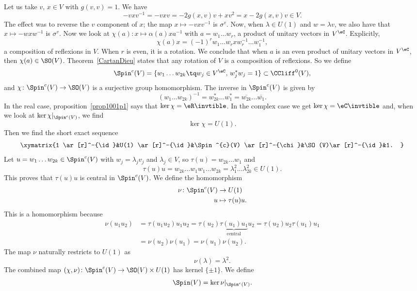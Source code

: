Let us take $v$, $x\in V$ with $g(v,v)=1$. We have
\[
	-vxv^{-1}=-vxv=-2g(x,v)v+xv^2
	=x-2g(x,v)v\in V.
\]
The effect was to reverse the $v$ component of $x$; the map $x\mapsto -vxv^{-1}$ is $\sigma^v$. Now, when $\lambda\in U(1)$ and $w=\lambda v$, we also have that $x\mapsto -wxw^{-1}$ is $\sigma^v$. Now we look at $\chi(a)\colon x\mapsto \alpha(a)xa^{-1}$ with $a=w_{1}\ldots w_{r}$, a product of unitary vectors in $V^{\eC}$. Explicitly,
\[
	\chi(a)x=(-1)^{r} w_{1}\ldots w_{r}xw_{r}^{-1}\ldots w_{1}^{-1},
\]
a composition of reflexions in $V$. When $r$ is even, it is a rotation. We conclude that when $a$ is an even product of unitary vectors in $V^{\eC}$, then $\chi(a)\in \SO(V)$. Theorem~\ref{CartanDieu} states that any rotation of $V$ is a composition of reflexions. So we define
\begin{equation}
	\Spin^{c}(V)=\{ w_{1}\ldots w_{2k}\tq w_{j}\in V^{\eC},\,w_{j}^*w_{j}=1 \}\subset \CCliff^{0}(V),
\end{equation}
and $\chi\colon \Spin^{c}(V)\to \SO(V)$ is a surjective group homomorphism. The inverse in $\Spin^{c}(V)$ is given by
\[
	(w_{1}\ldots w_{2k})^{-1}=w_{2k}^*\ldots w_{1}^*=\overline{ w_{2k} }\ldots\overline{ w_{1} }.
\]
In the real case, proposition~\ref{prop1001p1} says that $\ker\chi=\eR\invtible$. In the complex case we get  $\ker\chi=\eC\invtible$ and, when we look at $\ker\chi|_{\Spin^{c}(V)}$, we find
\begin{equation}
	\ker\chi=U(1).
\end{equation}
Then we find the short exact sequence
\begin{equation}
	\xymatrix{%
	1 \ar[r]^-{\id}&U(1) \ar[r]^-{\id}&\Spin^{c}(V) \ar[r]^-{\chi}&\SO(V)\ar[r]^-{\id}&1.
	}
\end{equation}
Let $u=w_{1}\ldots w_{2k}\in\Spin^{c}(V)$ with $w_{j}=\lambda_{j}v_{j}$ and $\lambda_{j}\in V$, so $\tau(u)=w_{2k}\ldots w_{1}$ and
\[
	\tau(u)u=w_{2k}\ldots w_{1}w_{1}\ldots w_{2k}
	=\lambda_{1}^{2}\ldots \lambda_{2k}^{2}\in U(1).
\]
This proves that $\tau(u)u$ is central in $\Spin^{c}(V)$. We define the homomorphism
\begin{equation}
	\begin{aligned}
		\nu \colon \Spin^{c}(V) & \to U(1)          \\
		u                       & \mapsto \tau(u)u.
	\end{aligned}
\end{equation}
This is a homomorphism because
\[
	\begin{split}
		\nu(u_{1}u_{2})&=\tau(u_{1}u_{2})u_{1}u_{2}
		=\tau(u_{2})\underbrace{\tau(u_{1})u_{1}}_{\text{central}}u_{2}
		=\tau(u_{2})u_{2}\tau(u_{1})u_{1}\\
		&=\nu(u_{2})\nu(u_{1})
		=\nu(u_{1})\nu(u_{2}).
	\end{split}
\]
The map $\nu$ naturally restricts to $U(1)$ as
\[
	\nu(\lambda)=\lambda^{2}.
\]
The combined map $(\chi,\nu)\colon \Spin^{c}(V)\to \SO(V)\times U(1)$ has kernel $\{ \pm 1 \}$. We define
\begin{equation}  \label{eq_defSpindeux}
	\Spin(V)=\ker\nu|_{\Spin^{c}(V)}.
\end{equation}

